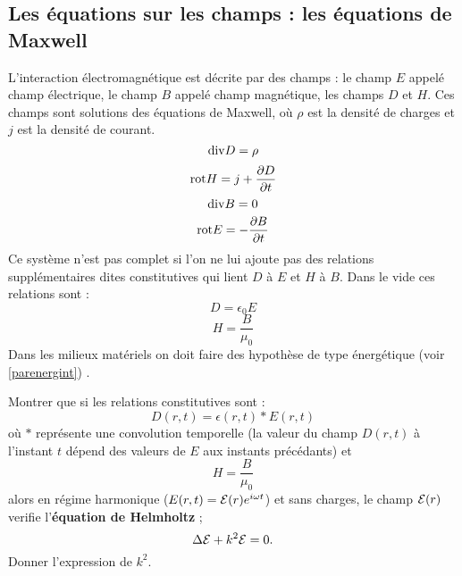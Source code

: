 \documentclass[12pt]{book}
\begin{document}
\subsection {Les \'equations sur les champs : les \'equations de Maxwell}
L'interaction \'electromagn\'etique est d\'ecrite par des champs : le
champ $E$ appel\'e champ \'electrique, le champ $B$ appel\'e champ
magn\'etique, les champs $D$ et $H$.
Ces champs sont solutions des \'equations de Maxwell,  o\`u $\rho$ est
la densit\'e de charges et $j$ est la densit\'e de courant.
\begin{equation}
{\rm div} D=\rho
\end{equation}
\begin{equation}
{\rm rot} H=j+\frac{\partial{D}}{\partial t}
\end{equation}
\begin{equation}
{\rm div} B=0
\end{equation}
\begin{equation}
{\rm rot} E=-\frac{\partial B}{\partial t}
\end{equation}
Ce syst\`eme n'est pas complet si l'on ne lui ajoute pas des relations
suppl\'ementaires dites constitutives qui lient $D$ \`a $E$ et $H$ \`a
$B$. 
Dans le vide ces relations sont :
\begin{equation}
D=\epsilon_0E
\end{equation}
\begin{equation}
H=\frac{B}{\mu_0}
\end{equation}
Dans les milieux mat\'eriels on doit faire des hypoth\`ese de type
\'energ\'etique (voir \ref{parenergint}) .

\begin{exo}
Montrer que si les relations constitutives sont :
\begin{equation}
D(r,t)=\epsilon(r,t) * E(r,t)
\end{equation}
o\`u $*$ repr\'esente une convolution temporelle (la valeur du champ $D(r,t)$
\`a l'instant $t$ d\'epend des valeurs de $E$ aux instants pr\'ec\'edants) et
\begin{equation}
H=\frac{B}{\mu_0}
\end{equation}
alors en r\'egime harmonique ($E(r,t)={\cal E}(r)e^{i\omega t}$) et sans
charges, le champ ${\cal E}(r)$ verifie l'{\bf \'equation de Helmholtz} ;
\begin{equation}
\Delta {\cal E}+k^{2}{\cal E}=0.
\end{equation}
Donner l'expression de $k^{2}$.
\end{exo}
\end{document}
